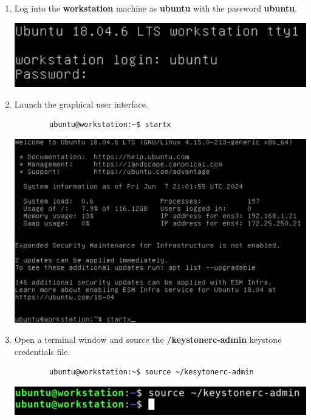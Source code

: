 \documentclass[letterpaper, 12pt]{article}
\begin{document}
\begin{enumerate}
    \item Log into the \textbf{workstation} machine as \textbf{ubuntu} with the password \textbf{ubuntu}.

    \begin{center}
        \includegraphics[width=\linewidth]{images/part1/step1.png}
    \end{center}

    \item Launch the graphical user interface.
    \begin{lstlisting}
        ubuntu@workstation:~$ startx
    \end{lstlisting}

    \begin{center}
        \includegraphics[width=\linewidth]{images/part1/step2.png}
    \end{center}

    \item Open a terminal window and source the \textbf{\texttildemid/keystonerc-admin} keystone credentials file.
    \begin{lstlisting}
        ubuntu@workstation:~$ source ~/kesytonerc-admin
    \end{lstlisting}

    \begin{center}
        \includegraphics[width=\linewidth]{images/part1/step3.png}
    \end{center}


\end{enumerate}
\end{document}
